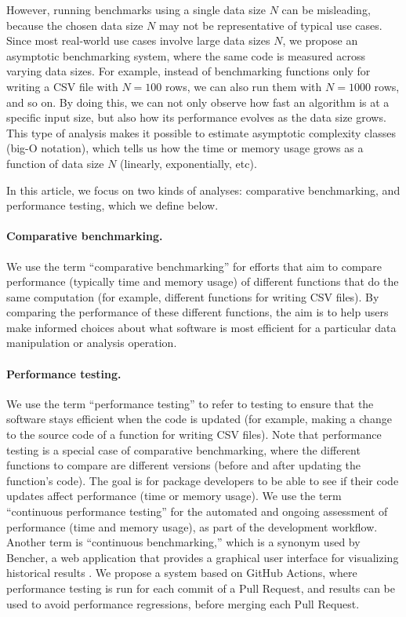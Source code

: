 However, running benchmarks using a single data size $N$ can be misleading, because the chosen data size $N$ may not be representative of typical use cases.
Since most real-world use cases involve large data sizes $N$, we propose an asymptotic benchmarking system, where the same code is measured across varying data sizes. 
For example, instead of benchmarking functions only for writing a CSV file with $N = 100$ rows, we can also run them with $N = 1000$ rows, and so on. 
By doing this, we can not only observe how fast an algorithm is at a specific input size, but also how its performance evolves as the data size grows. 
This type of analysis makes it possible to estimate asymptotic complexity classes (big-O notation), which tells us how the time or memory usage grows as a function of data size $N$ (linearly, exponentially, etc).


In this article, we focus on two kinds of analyses: comparative benchmarking, and performance testing, which we define below.
\paragraph{Comparative benchmarking.}
We use the term ``comparative benchmarking'' for efforts that aim to compare performance (typically time and memory usage) of different functions that do the same computation (for example, different functions for writing CSV files).
By comparing the performance of these different functions, the aim is to help users make informed choices about what software is most efficient for a particular data manipulation or analysis operation.
\paragraph{Performance testing.}
We use the term ``performance testing'' to refer to testing to ensure that the software stays efficient when the code is updated (for example, making a change to the source code of a function for writing CSV files). 
Note that performance testing is a special case of comparative benchmarking, where the different functions to compare are different versions (before and after updating the function's code). 
The goal is for package developers to be able to see if their code updates affect performance (time or memory usage).
We use the term ``continuous performance testing'' for the automated and ongoing assessment of performance (time and memory usage), as part of the development workflow. 
Another term is ``continuous benchmarking,'' which is a synonym used by Bencher, a web application that provides a graphical user interface for visualizing historical results \citep{bencher}.
We propose a system based on GitHub Actions, where performance testing is run for each commit of a Pull Request, and results can be used to avoid performance regressions, before merging each Pull Request.

